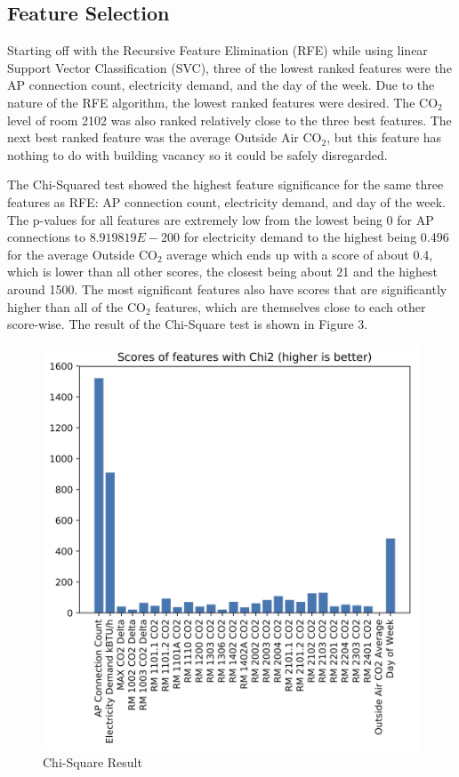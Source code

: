 \documentclass[letterpaper, 12 pt, conference]{ieeeconf}  %
\begin{document}
\subsection{Feature Selection}

Starting off with the Recursive Feature Elimination (RFE) while using linear Support Vector Classification (SVC), three of the lowest ranked features were the AP connection count, electricity demand, and the day of the week. Due to the nature of the RFE algorithm, the lowest ranked features were desired. The CO$_2$ level of room 2102 was also ranked relatively close to the  three best features. The next best ranked feature was the average Outside Air CO$_2$, but this feature has nothing to do with building vacancy so it could be safely disregarded.

The Chi-Squared test showed the highest feature significance for the same three features as RFE: AP connection count, electricity demand, and day of the week. The p-values for all features are extremely low from the lowest being 0 for AP connections to $8.919819E-200$ for electricity demand to the highest being 0.496 for the average Outside CO$_2$ average which ends up with a score of about 0.4, which is lower than all other scores, the closest being about 21 and the highest around 1500. The most significant features also have scores that are significantly higher than all of the CO$_2$ features, which are themselves close to each other score-wise. The result of the Chi-Square test is shown in Figure 3.

\begin{figure}[H]
        \caption{Chi-Square Result}
        \includegraphics[scale=0.16]{../figures/chi2.jpg}
\end{figure}
\end{document}
